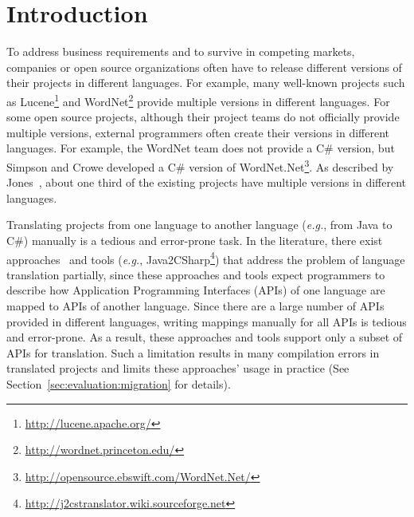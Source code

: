 \section{Introduction}
\label{sec:introduction}

To address business requirements
and to survive in competing markets, companies or open source
organizations often have to release different versions of their
projects in different languages. For example, many well-known
projects such as
Lucene\footnote{\url{http://lucene.apache.org/}}
and WordNet\footnote{\url{http://wordnet.princeton.edu/}} provide
multiple versions in different languages. For some open source
projects, although their project teams do not officially provide
multiple versions, external programmers often create their versions
in different languages. For example, the WordNet team does not
provide a C\# version, but Simpson and Crowe developed a C\# version
of
WordNet.Net\footnote{\url{http://opensource.ebswift.com/WordNet.Net/}}.
As described by Jones~\cite{jones1998estimating}, about
one third of the existing projects have multiple versions in
different languages.


Translating projects from one language to another language
(\emph{e.g.}, from Java to C\#) manually is a tedious and
error-prone task. In the literature, there exist
approaches~\cite{mossienko2003automated, yasumatsu1995spice} and tools (\emph{e.g.}, Java2CSharp\footnote{\url{http://j2cstranslator.wiki.sourceforge.net}}) that address the problem of language
translation partially, since these approaches and tools expect programmers to
describe how Application Programming Interfaces (APIs) of one language are mapped to APIs of another
language.  Since there are a large number of APIs provided in different languages,
writing mappings manually for all APIs is tedious and error-prone.
As a result, these approaches and tools
support only a subset of APIs for translation. Such a limitation
results in many compilation errors in translated projects and limits
these approaches' usage in practice (See Section~\ref{sec:evaluation:migration} for details).

